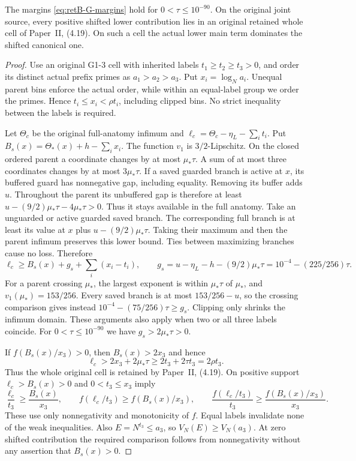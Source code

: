 \begin{lemma}\label{lem:retB-shifted-retention}
The margins \eqref{eq:retB-G-margins} hold for $0<\tau\le10^{-90}$.
On the original joint source, every positive shifted lower contribution
lies in an original retained whole cell of Paper~II, (4.19). On such a
cell the actual lower main term dominates the shifted canonical one.
\end{lemma}

\begin{proof}
Use an original G1-3 cell with inherited labels
$t_1\ge t_2\ge t_3>0$, and order its distinct actual prefix primes as
$a_1>a_2>a_3$. Put $x_i=\log_Na_i$. Unequal parent bins enforce the
actual order, while within an equal-label group we order the primes.
Hence $t_i\le x_i<\rho t_i$, including clipped bins.
No strict inequality between the labels is required.

Let $\Theta_c$ be the original full-anatomy infimum and
$\ell_c=\Theta_c-\eta_L-\sum_it_i$. Put
$B_s(x)=\Theta_*(x)+h-\sum_ix_i$.
The function $v_1$ is $3/2$-Lipschitz. On the closed ordered parent
a coordinate changes by at most $\mu_*\tau$. A sum of at most
three coordinates changes by at most $3\mu_*\tau$.
If a saved guarded branch is active at $x$, its buffered guard has
nonnegative gap, including equality. Removing its buffer adds $u$.
Throughout the parent its unbuffered gap is therefore at least
$u-(9/2)\mu_*\tau-4\mu_*\tau>0$.
Thus it stays available in the full anatomy. Take an unguarded or
active guarded saved branch. The corresponding full branch is at least
its value at $x$ plus $u-(9/2)\mu_*\tau$. Taking their maximum and then
the parent infimum preserves this lower bound. Ties between maximizing
branches cause no loss. Therefore
\[
 \ell_c\ge B_s(x)+g_s+\sum_i(x_i-t_i),\qquad
 g_s=u-\eta_L-h-(9/2)\mu_*\tau
     =10^{-4}-(225/256)\tau.
\]
For a parent crossing $\mu_*$, the largest exponent is within
$\mu_*\tau$ of $\mu_*$, and $v_1(\mu_*)=153/256$.
Every saved branch is at most $153/256-u$, so the crossing comparison
gives instead $10^{-4}-(75/256)\tau\ge g_s$.
Clipping only shrinks the infimum domain. These arguments also apply
when two or all three labels coincide.
For $0<\tau\le10^{-90}$ we have $g_s>2\mu_*\tau>0$.

If $f(B_s(x)/x_3)>0$, then $B_s(x)>2x_3$ and hence
\[
 \ell_c>2x_3+2\mu_*\tau
       \ge2t_3+2\tau t_3=2\rho t_3.
\]
Thus the whole original cell is retained by Paper~II, (4.19).
On positive support $\ell_c>B_s(x)>0$ and $0<t_3\le x_3$ imply
\[
 \frac{\ell_c}{t_3}\ge\frac{B_s(x)}{x_3},\qquad
 f(\ell_c/t_3)\ge f(B_s(x)/x_3),\qquad
 \frac{f(\ell_c/t_3)}{t_3}
      \ge\frac{f(B_s(x)/x_3)}{x_3}.
\]
These use only nonnegativity and monotonicity of $f$. Equal labels
invalidate none of the weak inequalities.
Also $E=N^{t_3}\le a_3$, so $V_N(E)\ge V_N(a_3)$.
At zero shifted contribution the required comparison follows from
nonnegativity without any assertion that $B_s(x)>0$.


\end{proof}
